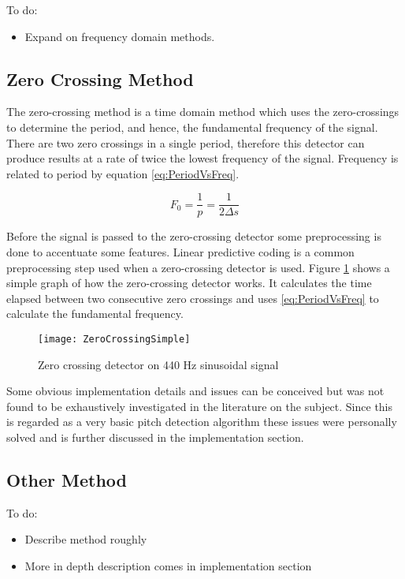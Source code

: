 \color{red}
To do:
\begin{itemize}
	\item Expand on frequency domain methods.
\end{itemize}
\color{black}

\subsection{Zero Crossing Method}

The zero-crossing method is a time domain method which uses the zero-crossings to
determine the period, and hence, the fundamental frequency of the signal. There
are two zero crossings in a single period, therefore this detector can produce
results at a rate of twice the lowest frequency of the signal. Frequency is
related to period by equation \ref{eq:PeriodVsFreq}.

\begin{equation}\label{eq:PeriodVsFreq}
	F_0 = \frac{1}{p} = \frac{1}{2\Delta s}
\end{equation}

Before the signal is passed to the zero-crossing detector some preprocessing is
done to accentuate some features. Linear predictive coding is a common
preprocessing step used when a zero-crossing detector is used\cite{PDABook}.
Figure \ref{fig:ZeroCrossing} shows a simple graph of how the zero-crossing
detector works. It calculates the time elapsed between two consecutive zero
crossings and uses \ref{eq:PeriodVsFreq} to calculate the fundamental frequency.

\begin{figure}[h]
	\label{fig:ZeroCrossing}
	\texttt{[image: ZeroCrossingSimple]}
	\caption{Zero crossing detector on 440 Hz sinusoidal signal}
\end{figure}

Some obvious implementation details and issues can be conceived but was not found
to be exhaustively investigated in the literature on the subject. Since this is
regarded as a very basic pitch detection algorithm these issues were personally
solved and is further discussed in the implementation section.

\subsection{Other Method}

\color{red}
To do:
\begin{itemize}
	\item Describe method roughly
	\item More in depth description comes in implementation section
\end{itemize}
\color{black}

